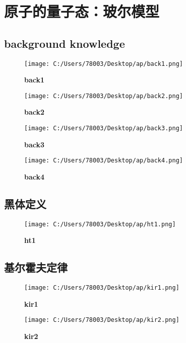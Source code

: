 \documentclass[UTF8]{report}
\theoremstyle{MyLineTheoremStyle} %
\theoremstyle{MyBlockTheoremStyle} %
\theoremstyle{MySubsubsectionStyle} %
\begin{document}
\chapter{原子的量子态：玻尔模型}\thispagestyle{fancy} 
\section{background knowledge}
\begin{figure}[ht]
    \centering
    \texttt{[image: C:/Users/78003/Desktop/ap/back1.png]}
    \caption{\textbf{back1}}
    \label{fig:back1}
\end{figure}
\begin{figure}[ht]
    \centering
    \texttt{[image: C:/Users/78003/Desktop/ap/back2.png]}
    \caption{\textbf{back2}}
    \label{fig:back2}
\end{figure}
\begin{figure}[ht]
    \centering
    \texttt{[image: C:/Users/78003/Desktop/ap/back3.png]}
    \caption{\textbf{back3}}
    \label{fig:back3}
\end{figure}
\begin{figure}[ht]
    \centering
    \texttt{[image: C:/Users/78003/Desktop/ap/back4.png]}
    \caption{\textbf{back4}}
    \label{fig:back4}
\end{figure}

\cleardoublepage
\section{黑体定义}

\begin{figure}[ht]
    \centering
    \texttt{[image: C:/Users/78003/Desktop/ap/ht1.png]}
    \caption{\textbf{ht1}}
    \label{fig:ht1}
\end{figure}

\cleardoublepage
\section{基尔霍夫定律}

\begin{figure}[ht]
    \centering
    \texttt{[image: C:/Users/78003/Desktop/ap/kir1.png]}
    \caption{\textbf{kir1}}
    \label{fig:kir1}
\end{figure}

\begin{figure}[ht]
    \centering
    \texttt{[image: C:/Users/78003/Desktop/ap/kir2.png]}
    \caption{\textbf{kir2}}
    \label{fig:kir2}
\end{figure}
\end{document}
